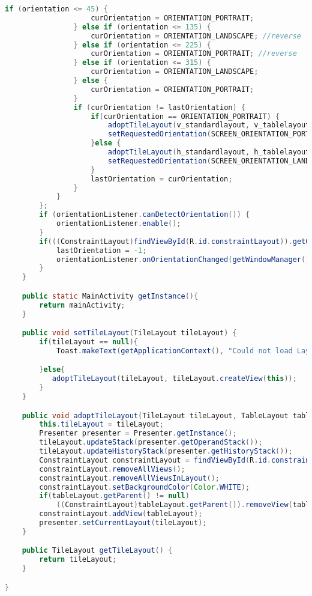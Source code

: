 \begin{lstlisting}[caption=MainActivity,label=list:MainActivity,language=Java]
                if (orientation <= 45) {
                    curOrientation = ORIENTATION_PORTRAIT;
                } else if (orientation <= 135) {
                    curOrientation = ORIENTATION_LANDSCAPE; //reverse
                } else if (orientation <= 225) {
                    curOrientation = ORIENTATION_PORTRAIT; //reverse
                } else if (orientation <= 315) {
                    curOrientation = ORIENTATION_LANDSCAPE;
                } else {
                    curOrientation = ORIENTATION_PORTRAIT;
                }
                if (curOrientation != lastOrientation) {
                    if(curOrientation == ORIENTATION_PORTRAIT) {
                        adoptTileLayout(v_standardlayout, v_tablelayout);
                        setRequestedOrientation(SCREEN_ORIENTATION_PORTRAIT);
                    }else {
                        adoptTileLayout(h_standardlayout, h_tablelayout);
                        setRequestedOrientation(SCREEN_ORIENTATION_LANDSCAPE);
                    }
                    lastOrientation = curOrientation;
                }
            }
        };
        if (orientationListener.canDetectOrientation()) {
            orientationListener.enable();
        }
        if(((ConstraintLayout)findViewById(R.id.constraintLayout)).getChildCount() == 0) {
            lastOrientation = -1;
            orientationListener.onOrientationChanged(getWindowManager().getDefaultDisplay().getRotation() * 90);
        }
    }

    public static MainActivity getInstance(){
        return mainActivity;
    }

    public void setTileLayout(TileLayout tileLayout) {
        if(tileLayout == null){
            Toast.makeText(getApplicationContext(), "Could not load Layout", Toast.LENGTH_LONG).show();

        }else{
           adoptTileLayout(tileLayout, tileLayout.createView(this));
        }
    }

    public void adoptTileLayout(TileLayout tileLayout, TableLayout tableLayout) {
        this.tileLayout = tileLayout;
        Presenter presenter = Presenter.getInstance();
        tileLayout.updateStack(presenter.getOperandStack());
        tileLayout.updateHistoryStack(presenter.getHistoryStack());
        ConstraintLayout constraintLayout = findViewById(R.id.constraintLayout);
        constraintLayout.removeAllViews();
        constraintLayout.removeAllViewsInLayout();
        constraintLayout.setBackgroundColor(Color.WHITE);
        if(tableLayout.getParent() != null)
            ((ConstraintLayout)tableLayout.getParent()).removeView(tableLayout);
        constraintLayout.addView(tableLayout);
        presenter.setCurrentLayout(tileLayout);
    }

    public TileLayout getTileLayout() {
        return tileLayout;
    }

}
\end{lstlisting} 

